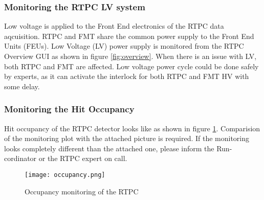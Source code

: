\subsubsection{Monitoring the RTPC LV system}
\label{sub-sec:LV}

Low voltage is applied to the Front End electronics of the RTPC data aqcuisition. RTPC and FMT share the common power supply to the Front End Units (FEUs). Low Voltage (LV) power supply is monitored from the RTPC Overview GUI as shown in figure \ref{fig:overview}. When there is an issue with LV, both RTPC and FMT are affected. Low voltage power cycle could be done safely by experts, as it can activate the interlock for both RTPC and FMT HV with some delay. 

\subsubsection{Monitoring the Hit Occupancy}
\label{sub-sec:monitoring}
Hit occupancy of the RTPC detector looks like as shown in figure \ref{fig:occupancy}. Comparision of the monitoring plot with the attached picture is required. If the monitoring looks completely different than the attached one, please inform the Run-cordinator or the RTPC expert on call.
\begin{figure}[H]
	\centering
	\texttt{[image: occupancy.png]}
	\caption{Occupancy monitoring of the RTPC}
	\label{fig:occupancy}
\end{figure}
